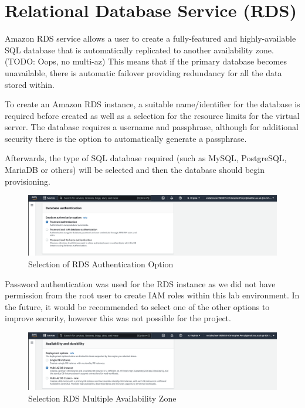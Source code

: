 \chapter{Relational Database Service (RDS)}\label{ch:relational-database-service}
Amazon RDS service allows a user to create a fully-featured and highly-available SQL database that is automatically
replicated to another availability zone. (TODO: Oops, no multi-az) This means that if the primary database becomes
unavailable, there is automatic failover providing redundancy for all the data stored within.

To create an Amazon RDS instance, a suitable name/identifier for the database is required before created as well as a
selection for the resource limits for the virtual server.
The database requires a username and passphrase, although for additional security there is the option to automatically
generate a passphrase.

Afterwards, the type of SQL database required (such as MySQL, PostgreSQL, MariaDB or others) will be selected and then
the database should begin provisioning.

\begin{figure}
    \centering
    \includegraphics[width=\textwidth]{resources/rds/rds-authentication.png}
    \caption{Selection of RDS Authentication Option}
    \label{fig:rds-auth}
\end{figure}

Password authentication was used for the RDS instance as we did not have permission from the root user to create IAM roles within this lab environment. In the future, it would be recommended to select one of the other options to improve security, however this was not possible for the project.

\begin{figure}
    \centering
    \includegraphics[width=\textwidth]{resources/rds/rds-availability-durability.png}
    \caption{Selection RDS Multiple Availability Zone}
    \label{fig:rds-avail}
\end{figure}

